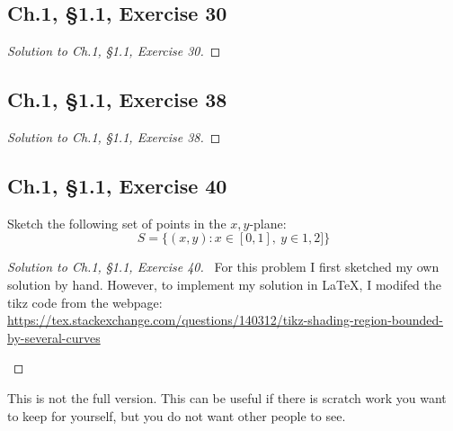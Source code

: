 \documentclass[12pt]{amsart}
\numberwithin{equation}{section}
\theoremstyle{definition}
\theoremstyle{remark}
\newif\ifnotes
\begin{document}


\subsection*{Ch.1, \S 1.1,  Exercise 30} 


\begin{proof}[Solution to Ch.1, \S 1.1,  Exercise 30]

\end{proof}





\subsection*{Ch.1, \S 1.1,  Exercise 38} 



\begin{proof}[Solution to Ch.1, \S 1.1,  Exercise 38]

\end{proof}




\subsection*{Ch.1, \S 1.1,  Exercise 40} 
 Sketch the following set of points in the $x,y$-plane:
$$
S=\{(x,y): x\in [0,1], \ y\in 1,2]\}
$$



\begin{proof}[Solution to Ch.1, \S 1.1,  Exercise 40]
\ 
For this problem I first sketched my own solution by hand.  However, to implement my solution in \LaTeX, I  modifed the tikz code from the webpage: 
\\ 
\url{https://tex.stackexchange.com/questions/140312/tikz-shading-region-bounded-by-several-curves}
\begin{center}
\end{center}

\end{proof}





\ifnotes


\else
	This is not the full version.  This can be useful if there is scratch work you want to keep for yourself, but you do not want other people to see. 
\fi





\end{document}
